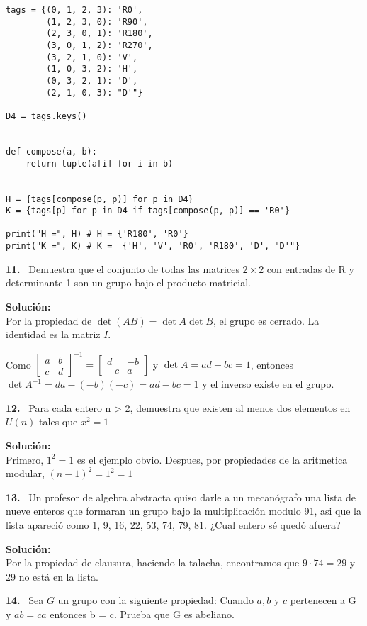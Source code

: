 \documentclass{article}
\newcounter{problem}
\newcounter{solution}
\newcommand\Problem[1]{%
  \stepcounter{problem}%
  \textbf{#1.}~%
  \setcounter{solution}{0}%
}
\newcommand\TheSolution{%
  \textbf{Solución:}\\%
}
\begin{document}
\begin{lstlisting}
tags = {(0, 1, 2, 3): 'R0',
        (1, 2, 3, 0): 'R90',
        (2, 3, 0, 1): 'R180',
        (3, 0, 1, 2): 'R270',
        (3, 2, 1, 0): 'V',
        (1, 0, 3, 2): 'H',
        (0, 3, 2, 1): 'D',
        (2, 1, 0, 3): "D'"}

D4 = tags.keys()


def compose(a, b):
    return tuple(a[i] for i in b)


H = {tags[compose(p, p)] for p in D4}
K = {tags[p] for p in D4 if tags[compose(p, p)] == 'R0'}

print("H =", H) # H = {'R180', 'R0'}
print("K =", K) # K =  {'H', 'V', 'R0', 'R180', 'D', "D'"}
\end{lstlisting}

\Problem{11} Demuestra que el conjunto de todas las matrices $2 \times 2$ con
entradas de R y determinante 1 son un grupo bajo el producto matricial.

\TheSolution{}
Por la propiedad de $\det {(AB)} = \det A \det B$, el grupo es cerrado. La
identidad es la matriz $I$.

Como $\begin{bmatrix}a&b\\c&d\end{bmatrix}^{-1} = \begin{bmatrix}d&-b\\-c&a
\end{bmatrix}$ y $\det A = ad - bc = 1$, entonces $\det A^{-1} = da -
(-b)(-c) = ad - bc = 1$ y el inverso existe en el grupo.

\Problem{12} Para cada entero n > 2, demuestra que existen al menos dos
elementos en $U(n)$ tales que $x^2 = 1$

\TheSolution{}
Primero, $1^2 = 1$ es el ejemplo obvio. Despues, por propiedades de la
aritmetica modular, ${(n - 1)}^2 = 1^2 = 1$

\Problem{13} Un profesor de algebra abstracta quiso darle a un mecanógrafo una
lista de nueve enteros que formaran un grupo bajo la multiplicación modulo 91,
asi que la lista apareció como 1, 9, 16, 22, 53, 74, 79, 81. ¿Cual entero sé
quedó afuera?

\TheSolution{}
Por la propiedad de clausura, haciendo la talacha, encontramos que $9 · 74 =
29$ y 29 no está en la lista.

\Problem{14} Sea $G$ un grupo con la siguiente propiedad: Cuando $a, b$ y $c$
pertenecen a G y $ab = ca$ entonces b = c. Prueba que G es abeliano.
\end{document}
